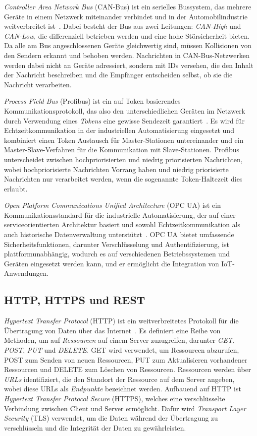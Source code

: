 \emph{Controller Area Network Bus} (CAN-Bus) ist ein serielles Bussystem, das mehrere Geräte in einem Netzwerk miteinander verbindet und in der Automobilindustrie weitverbreitet ist~\cite{CANBus}.
Dabei besteht der Bus aus zwei Leitungen: \emph{CAN-High} und \emph{CAN-Low}, die differenziell betrieben werden und eine hohe Störsicherheit bieten.
Da alle am Bus angeschlossenen Geräte gleichwertig sind, müssen Kollisionen von den Sendern erkannt und behoben werden.
Nachrichten in CAN-Bus-Netzwerken werden dabei nicht an Geräte adressiert, sondern mit IDs versehen, die den Inhalt der Nachricht beschreiben und die Empfänger entscheiden selbst, ob sie die Nachricht verarbeiten.

\emph{Process Field Bus} (Profibus) ist ein auf Token basierendes Kommunikationsprotokoll, das also den unterschiedlichen Geräten im Netzwerk durch Verwendung eines \emph{Tokens} eine gewisse Sendezeit garantiert~\cite{Fieldbus}.
Es wird für Echtzeitkommunikation in der industriellen Automatisierung eingesetzt und kombiniert einen Token Austausch für Master-Stationen untereinander und ein Master-Slave-Verfahren für die Kommunikation mit Slave-Stationen.
Profibus unterscheidet zwischen hochpriorisierten und niedrig priorisierten Nachrichten, wobei hochpriorisierte Nachrichten Vorrang haben und niedrig priorisierte Nachrichten nur verarbeitet werden, wenn die sogenannte Token-Haltezeit dies erlaubt.

\emph{Open Platform Communications Unified Architecture} (OPC UA) ist ein Kommunikationsstandard für die industrielle Automatisierung, der auf einer serviceorientierten Architektur basiert und sowohl Echtzeitkommunikation als auch historische Datenverwaltung unterstützt~\cite{OPCUA}.
OPC UA bietet umfassende Sicherheitsfunktionen, darunter Verschlüsselung und Authentifizierung, ist plattformunabhängig, wodurch es auf verschiedenen Betriebssystemen und Geräten eingesetzt werden kann, und er ermöglicht die Integration von IoT-Anwendungen.


\subsection*{HTTP, HTTPS und REST}
\emph{Hypertext Transfer Protocol} (HTTP) ist ein weitverbreitetes Protokoll für die Übertragung von Daten über das Internet~\cite{HTTP}.
Es definiert eine Reihe von Methoden, um auf \emph{Ressourcen} auf einem Server zuzugreifen, darunter \emph{GET}, \emph{POST}, \emph{PUT} und \emph{DELETE}.
GET wird verwendet, um Ressourcen abzurufen, POST zum Senden von neuen Ressourcen, PUT zum Aktualisieren vorhandener Ressourcen und DELETE zum Löschen von Ressourcen.
Ressourcen werden über \emph{URLs} identifiziert, die den Standort der Ressource auf dem Server angeben, wobei diese URLs als \emph{Endpunkte} bezeichnet werden.
Aufbauend auf HTTP ist \emph{Hypertext Transfer Protocol Secure} (HTTPS), welches eine verschlüsselte Verbindung zwischen Client und Server ermöglicht.
Dafür wird \emph{Transport Layer Security} (TLS) verwendet, um die Daten während der Übertragung zu verschlüsseln und die Integrität der Daten zu gewährleisten.

